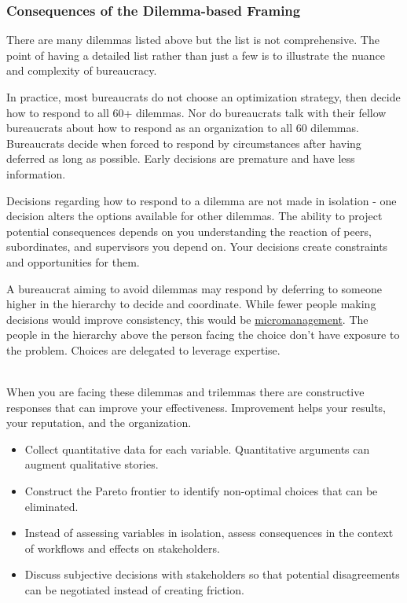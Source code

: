 \subsubsection*{Consequences of the Dilemma-based Framing}

There are many dilemmas listed above but the list is not comprehensive. The point of having a detailed list rather than just a few is to illustrate the nuance and complexity of bureaucracy. 


In practice, most bureaucrats do not choose an optimization strategy, then decide how to respond to all 60+ dilemmas.
Nor do bureaucrats talk with their fellow bureaucrats about how to respond as an organization to all 60 dilemmas.
Bureaucrats decide when forced to respond by circumstances after having deferred as long as possible. Early decisions are premature and have less information.

Decisions regarding how to respond to a dilemma are not made in isolation - one decision alters the options available for other dilemmas. The ability to project potential consequences depends on you understanding the reaction of peers, subordinates, and supervisors you depend on. Your decisions create constraints and opportunities for them.



A bureaucrat aiming to avoid dilemmas may respond by deferring to someone higher in the hierarchy to decide and coordinate. While fewer people making decisions would improve consistency, this would be \href{https://en.wikipedia.org/wiki/Micromanagement}{micromanagement}. 
The people in the hierarchy above the person facing the choice don't have exposure to the problem. Choices are delegated to leverage expertise. 

\ \\

When you are facing these dilemmas and trilemmas
%
there are constructive responses that can improve your effectiveness. Improvement helps your results, your reputation, and the organization. 
\begin{itemize}
    \item Collect quantitative data for each variable. Quantitative arguments can augment qualitative stories. 
    \item Construct the Pareto frontier to identify non-optimal choices that can be eliminated.
    \item Instead of assessing variables in isolation, assess consequences in the context of workflows and effects on stakeholders.
    \item Discuss subjective decisions with stakeholders so that potential disagreements can be negotiated instead of creating friction.
\end{itemize}
 


